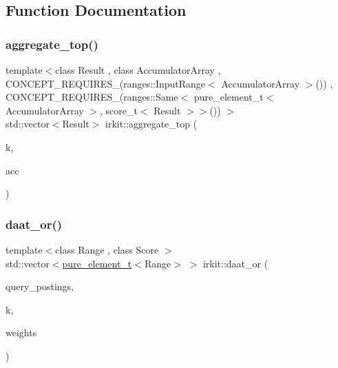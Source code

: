 \subsection{Function Documentation}
\mbox{\label{namespaceirkit_a396aecdabea315348fb31d095fd2efc8}} 
\subsubsection{\texorpdfstring{aggregate\+\_\+top()}{aggregate\_top()}}
{\footnotesize\ttfamily template$<$class Result , class Accumulator\+Array , C\+O\+N\+C\+E\+P\+T\+\_\+\+R\+E\+Q\+U\+I\+R\+E\+S\+\_\+(ranges\+::\+Input\+Range$<$ Accumulator\+Array $>$()) , C\+O\+N\+C\+E\+P\+T\+\_\+\+R\+E\+Q\+U\+I\+R\+E\+S\+\_\+(ranges\+::\+Same$<$ pure\+\_\+element\+\_\+t$<$ Accumulator\+Array $>$, score\+\_\+t$<$ Result $>$$>$()) $>$ \\
std\+::vector$<$Result$>$ irkit\+::aggregate\+\_\+top (\begin{DoxyParamCaption}\item[{std\+::size\+\_\+t}]{k,  }\item[{const Accumulator\+Array \&}]{acc }\end{DoxyParamCaption})}

\mbox{\label{namespaceirkit_ad6a1763616725ecb88e751ea7eb93453}} 
\subsubsection{\texorpdfstring{daat\+\_\+or()}{daat\_or()}}
{\footnotesize\ttfamily template$<$class Range , class Score $>$ \\
std\+::vector$<$\hyperlink{namespaceirkit_afcffab67300c5c703cb38a363c9a6f1d}{pure\+\_\+element\+\_\+t}$<$Range$>$ $>$ irkit\+::daat\+\_\+or (\begin{DoxyParamCaption}\item[{const std\+::vector$<$ Range $>$ \&}]{query\+\_\+postings,  }\item[{std\+::size\+\_\+t}]{k,  }\item[{const std\+::vector$<$ Score $>$ \&}]{weights }\end{DoxyParamCaption})}



